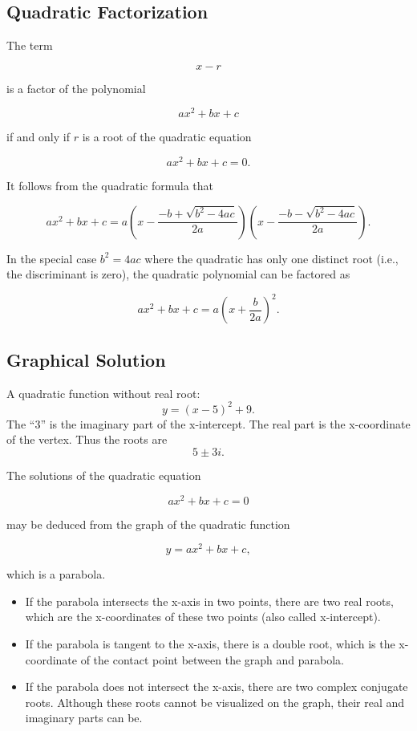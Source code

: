 \subsection{Quadratic Factorization}
\label{sss:quad-1f80}

The term

\[
x - r
\] 

is a factor of the polynomial

\[
ax^2 + bx + c
\] 

if and only if $r$ is a root of the quadratic equation 

\[
ax^2 + bx + c = 0.
\] 

It follows from the quadratic formula that

\[
ax^2 + bx + c = a \left(x - \frac{-b + \sqrt{b^2 - 4ac}}{2a}\right) \left(x - \frac{-b - \sqrt{b^2 - 4ac}}{2a}\right).
\]

In the special case $b^2 = 4ac$ where the quadratic has only one distinct root (i.e., the discriminant is zero), the quadratic polynomial can be factored as 

\[
ax^2 + bx + c = a \left(x + \frac{b}{2a}\right)^2.
\]

\subsection{Graphical Solution}
\label{sss:grap-2f4d}

A quadratic function without real root: \[
y = (x - 5)^2 + 9.
\] The ``3'' is the imaginary part of the x-intercept. The real part is the x-coordinate of the vertex. Thus the roots are \[
5 \pm 3i.
\]


The solutions of the quadratic equation

\[
ax^2 + bx + c = 0
\]

may be deduced from the graph of the quadratic function

\[
y = ax^2 + bx + c,
\]

which is a parabola.

\begin{itemize}
    \item If the parabola intersects the x-axis in two points, there are two real roots, which are the x-coordinates of these two points (also called x-intercept).
    \item If the parabola is tangent to the x-axis, there is a double root, which is the x-coordinate of the contact point between the graph and parabola.
    \item If the parabola does not intersect the x-axis, there are two complex conjugate roots. Although these roots cannot be visualized on the graph, their real and imaginary parts can be.
\end{itemize}

